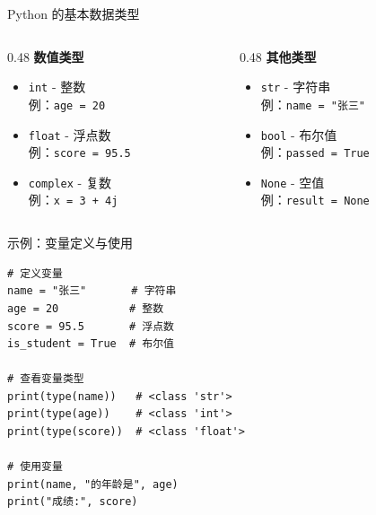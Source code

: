 \documentclass[aspectratio=43,12pt]{beamer}
\begin{document}
\begin{frame}{Python 的基本数据类型}
    \begin{columns}[T]
        \begin{column}{0.48\textwidth}
            \textbf{数值类型}
            \begin{itemize}
                \item \texttt{int} - 整数\\
                例：\texttt{age = 20}
                \item \texttt{float} - 浮点数\\
                例：\texttt{score = 95.5}
                \item \texttt{complex} - 复数\\
                例：\texttt{x = 3 + 4j}
            \end{itemize}
        \end{column}
        \begin{column}{0.48\textwidth}
            \textbf{其他类型}
            \begin{itemize}
                \item \texttt{str} - 字符串\\
                例：\texttt{name = "张三"}
                \item \texttt{bool} - 布尔值\\
                例：\texttt{passed = True}
                \item \texttt{None} - 空值\\
                例：\texttt{result = None}
            \end{itemize}
        \end{column}
    \end{columns}
\end{frame}

\begin{frame}[fragile]{示例：变量定义与使用}
    \begin{lstlisting}
# 定义变量
name = "张三"       # 字符串
age = 20           # 整数
score = 95.5       # 浮点数
is_student = True  # 布尔值

# 查看变量类型
print(type(name))   # <class 'str'>
print(type(age))    # <class 'int'>
print(type(score))  # <class 'float'>

# 使用变量
print(name, "的年龄是", age)
print("成绩:", score)
    \end{lstlisting}
\end{frame}
\end{document}
